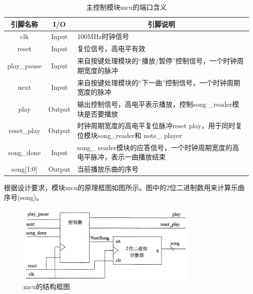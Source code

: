 \documentclass{../source/Experiment}
\begin{document}
                \begin{table}[H]
                    \caption{主控制模块mcu的端口含义}
                    \begin{tabular}{|c|c|p{}|}
                        \hline
                        引脚名称          & I/O    & \multicolumn{1}{c|}{引脚说明}                                    \\ \hline
                        clk           & Input  & 100MHz时钟信号                                                   \\ \hline
                        reset         & Input  & 复位信号，高电平有效                                                   \\ \hline
                        play\_pause   & Input  & 来自按键处理模块的“播放/暂停”控制信号，一个时钟周期宽度的脉冲                             \\ \hline
                        next          & Input  & 来自按键处理模块的“下一曲”控制信号，一个时钟周期宽度的脉冲                               \\ \hline
                        play          & Output & 输出控制信号，高电平表示播放，控制song \_reader模块是否要播放                        \\ \hline
                        reset\_play   & Output & 时钟周期宽度的高电平复位脉冲reset play，用于同时复位模块song\_reader和 note\_ player \\ \hline
                        song\_done    & Input  & song\_ reader模块的应答信号，一个时钟周期宽度的高电平脉冲，表示一曲播放结束                 \\ \hline
                        song{[}1:0{]} & Output & 当前播放乐曲的序号                                                    \\ \hline
                    \end{tabular}
                \end{table}
                根据设计要求，模块mcu的原理框图如图所示。图中的2位二进制数用来计算乐曲序号(song)。

                \begin{figure}[H]
                    \centering
                    \includegraphics[width = 0.8\textwidth]{pic/mcu.png}
                    \caption{mcu的结构框图}
                \end{figure}
\end{document}
